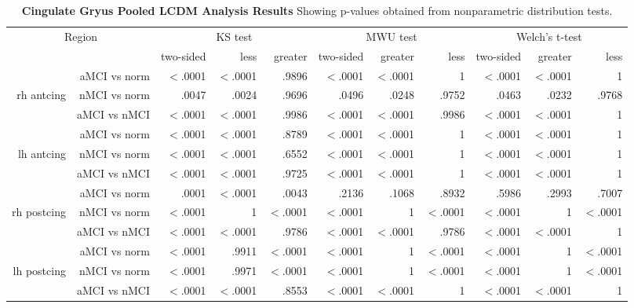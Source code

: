 \documentclass[12pt]{article}\usepackage[]{graphicx}\usepackage[]{color}
\newcommand\T{\rule{0pt}{2.6ex}}
\newcommand\B{\rule[-1.2ex]{0pt}{0pt}}
\begin{document}
\newpage
\begin{sidewaystable}
	\centering
	\footnotesize
	\begin{tabular}{rr|rrr|rrr|rrr}
		\hline
		\multicolumn{2}{c|}{Region} \T\B & \multicolumn{3}{c|}{KS test} & \multicolumn{3}{c|}{MWU test} & \multicolumn{3}{c}{Welch's t-test} \\
		& & two-sided & less & greater & two-sided & greater & less & two-sided & greater & less \\ \hline
		& aMCI vs norm\T &  $<$.0001 & $<$.0001 & .9896 &  $<$.0001 & $<$.0001 & 1 &  $<$.0001 & $<$.0001 & 1 \\
		rh antcing & nMCI vs norm & .0047 & .0024 & .9696 & .0496 & .0248 & .9752 & .0463 & .0232 & .9768 \\
		& aMCI vs nMCI & $<$.0001 & $<$.0001 & .9986 & $<$.0001 & $<$.0001 & .9986 & $<$.0001 & $<$.0001 & 1 \\ \hline
		& aMCI vs norm\T & $<$.0001 & $<$.0001 & .8789 & $<$.0001 & $<$.0001 & 1 & $<$.0001 & $<$.0001 & 1 \\
		lh antcing & nMCI vs norm & $<$.0001 & $<$.0001 & .6552 & $<$.0001 & $<$.0001 & 1 & $<$.0001 & $<$.0001 & 1 \\
		& aMCI vs nMCI & $<$.0001 & $<$.0001 & .9725 & $<$.0001 & $<$.0001 & 1 & $<$.0001 & $<$.0001 & 1 \\ \hline
		& aMCI vs norm\T & .0001 & $<$.0001 & .0043 & .2136 & .1068 & .8932 & .5986 & .2993 & .7007 \\
		rh postcing & nMCI vs norm & $<$.0001 & 1 & $<$.0001 & $<$.0001 & 1 & $<$.0001 & $<$.0001 & 1 & $<$.0001 \\
		& aMCI vs nMCI & $<$.0001 & $<$.0001 & .9786 & $<$.0001 & $<$.0001 & .9786 & $<$.0001 & $<$.0001 & 1 \\ \hline
		& aMCI vs norm\T & $<$.0001 & .9911 & $<$.0001 & $<$.0001 & 1 & $<$.0001  & $<$.0001 & 1 & $<$.0001  \\
		lh postcing & nMCI vs norm & $<$.0001 & .9971 & $<$.0001 & $<$.0001 & 1 & $<$.0001 & $<$.0001 & 1 & $<$.0001 \\
		& aMCI vs nMCI & $<$.0001 & $<$.0001 & .8553 & $<$.0001 & $<$.0001 & 1 & $<$.0001 & $<$.0001 & 1 \\
	\end{tabular}
	\caption{\textbf{Cingulate Gryus Pooled LCDM Analysis Results}   Showing p-values obtained from nonparametric distribution tests.}
	\label{Wave1.cing.nonpara}
\end{sidewaystable}
\end{document}
